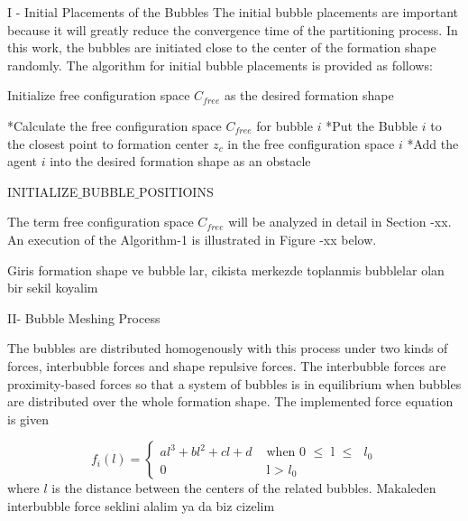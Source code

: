 \documentclass[twoside]{article}
\begin{document}
			I - Initial Placements of the Bubbles
		  The initial bubble placements are important because it will greatly reduce the convergence time of the partitioning process. In this work, the bubbles are initiated close to the center of the formation shape randomly. The algorithm for initial bubble placements is provided as follows:
		  

			
			
			\begin{algorithm}[H]
				
				Initialize free configuration space $C_{free}$ as the desired formation shape
				
				{		
					*Calculate the free configuration space $C_{free}$ for bubble $i$\;
					 *Put the Bubble $i$ to the closest point to  formation center  $z_c$  in the free configuration space $i$ \;
					 *Add the agent $i$ into the desired formation shape as an obstacle \;
				}
				
				
				\caption{INITIALIZE$\_$BUBBLE$\_$POSITIOINS}
			\end{algorithm}
		
		The term free configuration space $C_{free}$ will be analyzed in detail in Section -xx. An execution of the Algorithm-1 is illustrated in Figure -xx below.
		
		Giris formation shape ve bubble lar, cikista merkezde toplanmis bubblelar olan bir sekil koyalim
		
		II- Bubble Meshing Process 
		
		The bubbles are distributed homogenously with this process under two kinds of forces, interbubble forces and shape repulsive forces. The interbubble forces are proximity-based forces so that a system of bubbles is in equilibrium when bubbles are distributed over the whole formation shape. The implemented force equation is given
		
		\begin{equation}
		f_i(l) = \left\{ \begin{array}{rl}
		al^3 + bl^2 + cl + d &\mbox{ when 0 $\leq$ l $\leq$ $l_0$} \\
		0                               &\mbox{ l > $l_0$}
		\end{array} \right.
		\end{equation}
	where $l$ is the distance between the centers of the related bubbles. 
	Makaleden interbubble force seklini alalim ya da biz cizelim
	
\end{document}
